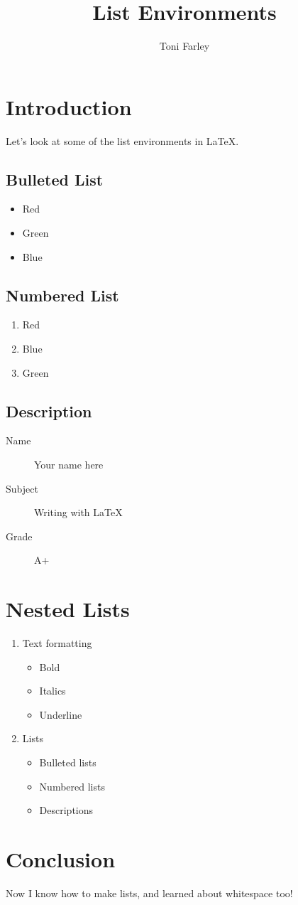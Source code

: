 \documentclass{article}
\title{List Environments}
\author{Toni Farley}
\date{}
\begin{document}
\maketitle

\section{Introduction}

Let's look at some of the list environments in \LaTeX.

\subsection{Bulleted List}

\begin{itemize}
\item Red
\item Green
\item Blue
\end{itemize}

\subsection{Numbered List}

\begin{enumerate}
\item Red
\item Blue
\item Green
\end{enumerate}

\subsection{Description}

\begin{description}
	\item[Name] Your name here
	\item[Subject] Writing with \LaTeX
	\item[Grade] A+
\end{description}

\section{Nested Lists}

\begin{enumerate}
\item Text formatting
	\begin{itemize}
	\item Bold
	\item Italics
	\item Underline
	\end{itemize}
\item Lists
	\begin{itemize}
	\item Bulleted lists
	\item Numbered lists
	\item Descriptions
	\end{itemize}
\end{enumerate}

\section{Conclusion}

Now I know how to make lists, and learned about whitespace too!
\end{document}
